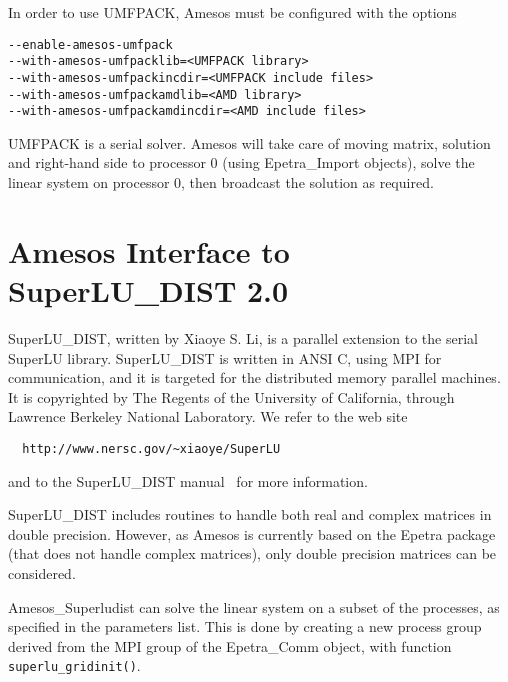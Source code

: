 \documentclass[11pt]{SANDreport}
\begin{document}
In order to use UMFPACK, Amesos must be configured with the options
\begin{verbatim}
--enable-amesos-umfpack 
--with-amesos-umfpacklib=<UMFPACK library> 
--with-amesos-umfpackincdir=<UMFPACK include files>
--with-amesos-umfpackamdlib=<AMD library>
--with-amesos-umfpackamdincdir=<AMD include files>
\end{verbatim}

UMFPACK is a serial solver. Amesos will take care of moving matrix,
solution and right-hand side to processor 0 (using Epetra\_Import
objects), solve the linear system on processor 0, then broadcast the
solution as required.




\section{Amesos Interface to SuperLU\_DIST 2.0}
\label{sec:superludist}

SuperLU\_DIST, written by Xiaoye S. Li, is a parallel extension to the
serial SuperLU library.  SuperLU\_DIST is written in ANSI C, using MPI
for communication, and it is targeted for the distributed memory
parallel machines. It is copyrighted by The Regents of the University of
California, through Lawrence Berkeley National Laboratory.  We refer to
the web site
\begin{verbatim}
  http://www.nersc.gov/~xiaoye/SuperLU
\end{verbatim}
and to the SuperLU\_DIST manual~\cite{superlu-manual} for more
information.

SuperLU\_DIST includes routines to handle both real and complex matrices
in double precision. However, as Amesos is currently based on the Epetra
package (that does not handle complex matrices), only double precision
matrices can be considered.

Amesos\_Superludist can solve the linear system on a subset of the
processes, as specified in the parameters list. This is done by
creating a new process group derived from the MPI group of the
Epetra\_Comm object, with function \verb!superlu_gridinit()!. 

\medskip
\end{document}
